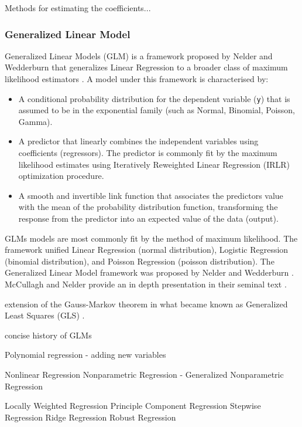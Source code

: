 \begin{bibunit}
Methods for estimating the coefficients...


\subsubsection{Generalized Linear Model}
Generalized Linear Models (GLM) is a framework proposed by Nelder and Wedderburn that generalizes Linear Regression to a broader class of maximum likelihood estimators \cite{Nelder1972}. A model under this framework is characterised by:

\begin{itemize}
	\item A conditional probability distribution for the dependent variable (\texttt{y}) that is assumed to be in the exponential family (such as Normal, Binomial, Poisson, Gamma).
	\item A predictor that linearly combines the independent variables using coefficients (regressors). The predictor is commonly fit by the maximum likelihood estimates using Iteratively Reweighted Linear Regression (IRLR) optimization procedure.
	\item A smooth and invertible link function that associates the predictors value with the mean of the probability distribution function, transforming the response from the predictor into an expected value of the data (output).
\end{itemize}

 GLMs models are most commonly fit by the method of maximum likelihood. 
The framework unified Linear Regression (normal distribution), Logistic Regression (binomial distribution), and Poisson Regression (poisson distribution). The Generalized Linear Model framework was proposed by Nelder and Wedderburn \cite{Nelder1972}. McCullagh and Nelder provide an in depth presentation in their seminal text \cite{McCullagh1989}.

extension of the Gauss-Markov theorem in what became known as Generalized Least Squares (GLS) \cite{Aitken1935}.

concise history of GLMs \cite{McCulloch2000}

Polynomial regression - adding new variables


Nonlinear Regression
Nonparametric Regression - Generalized Nonparametric Regression

Locally Weighted Regression
Principle Component Regression
Stepwise Regression
Ridge Regression
Robust Regression


\end{bibunit}

